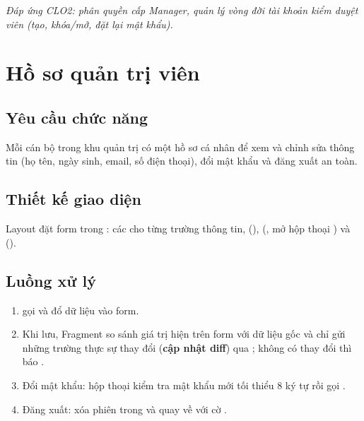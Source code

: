 \textit{Đáp ứng CLO2: phân quyền cấp Manager, quản lý vòng đời tài khoản kiểm
duyệt viên (tạo, khóa/mở, đặt lại mật khẩu).}

\section{Hồ sơ quản trị viên}

\subsection{Yêu cầu chức năng}
Mỗi cán bộ trong khu quản trị có một hồ sơ cá nhân để xem và chỉnh sửa thông
tin (họ tên, ngày sinh, email, số điện thoại), đổi mật khẩu và đăng xuất an
toàn.

\subsection{Thiết kế giao diện}
Layout  đặt form trong
: các  cho từng trường thông tin,
  (), 
(, mở hộp thoại ) và
 ().


\subsection{Luồng xử lý}
\begin{enumerate}
    \item {} gọi  và đổ dữ liệu
    vào form.
    \item Khi lưu, Fragment so sánh giá trị hiện trên form với dữ liệu gốc và chỉ
    gửi những trường thực sự thay đổi (\textbf{cập nhật diff}) qua
    ; không có thay đổi thì báo
    .
    \item Đổi mật khẩu: hộp thoại kiểm tra mật khẩu mới tối thiểu 8 ký tự rồi
    gọi .
    \item Đăng xuất:  xóa phiên trong
     và quay về  với cờ
    .
\end{enumerate}

